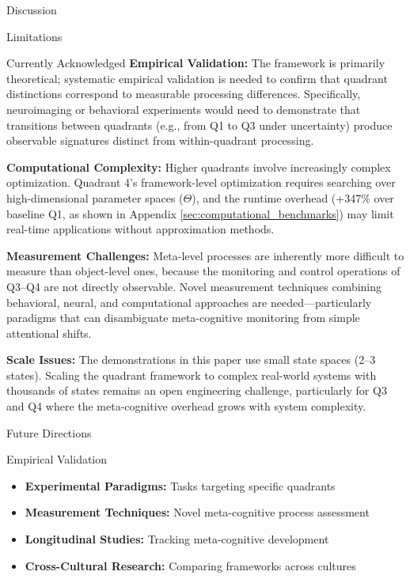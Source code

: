 \documentclass[
  ignorenonframetext,
]{beamer}
\providecommand{\tightlist}{%
  \setlength{\itemsep}{0pt}\setlength{\parskip}{0pt}}
\begin{document}
\begin{frame}{Discussion}
\begin{block}{Limitations}
\protect{}\label{sec:limitations}
\begin{block}{Currently Acknowledged}
\protect{}\label{currently-acknowledged}
\textbf{Empirical Validation:} The framework is primarily theoretical;
systematic empirical validation is needed to confirm that quadrant
distinctions correspond to measurable processing differences.
Specifically, neuroimaging or behavioral experiments would need to
demonstrate that transitions between quadrants (e.g., from Q1 to Q3
under uncertainty) produce observable signatures distinct from
within-quadrant processing.

\textbf{Computational Complexity:} Higher quadrants involve increasingly
complex optimization. Quadrant 4's framework-level optimization requires
searching over high-dimensional parameter spaces (\(\Theta\)), and the
runtime overhead (+347\% over baseline Q1, as shown in Appendix
\ref{sec:computational_benchmarks}) may limit real-time applications
without approximation methods.

\textbf{Measurement Challenges:} Meta-level processes are inherently
more difficult to measure than object-level ones, because the monitoring
and control operations of Q3--Q4 are not directly observable. Novel
measurement techniques combining behavioral, neural, and computational
approaches are needed---particularly paradigms that can disambiguate
meta-cognitive monitoring from simple attentional shifts.

\textbf{Scale Issues:} The demonstrations in this paper use small state
spaces (2--3 states). Scaling the quadrant framework to complex
real-world systems with thousands of states remains an open engineering
challenge, particularly for Q3 and Q4 where the meta-cognitive overhead
grows with system complexity.
\end{block}
\end{block}

\begin{block}{Future Directions}
\protect{}\label{sec:future_directions}
\begin{block}{Empirical Validation}
\protect{}\label{empirical-validation}
\begin{itemize}
\tightlist
\item
  \textbf{Experimental Paradigms:} Tasks targeting specific quadrants
\item
  \textbf{Measurement Techniques:} Novel meta-cognitive process
  assessment
\item
  \textbf{Longitudinal Studies:} Tracking meta-cognitive development
\item
  \textbf{Cross-Cultural Research:} Comparing frameworks across cultures
\end{itemize}
\end{block}


\end{block}
\end{frame}
\end{document}
